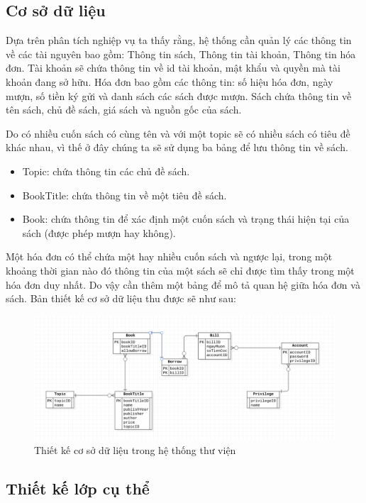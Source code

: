 \documentclass[../report.tex]{subfiles}
\begin{document}
\subsection{Cơ sở dữ liệu}
Dựa trên phân tích nghiệp vụ ta thấy rằng, hệ thống cần quản lý các thông 
tin về các tài nguyên bao gồm: Thông tin sách, Thông tin tài khoản, 
Thông tin hóa đơn.
Tài khoản sẽ chứa thông tin về id tài khoản, mật khẩu và quyền mà 
tài khoản đang sở hữu.
Hóa đơn bao gồm các thông tin: số hiệu hóa đơn, ngày mượn, 
số tiền ký gửi và danh sách các sách được mượn.
Sách chứa thông tin về tên sách, chủ đề sách, 
giá sách và nguồn gốc của sách. 

Do có nhiều cuốn sách có cùng tên và với một topic sẽ có nhiều sách có tiêu đề khác nhau,
vì thế ở đây chúng ta sẽ sử dụng ba bảng để lưu thông tin về sách. 
\begin{itemize}
      \item Topic: chứa thông tin các chủ đề sách.
\item BookTitle: chứa thông tin về một tiêu đề sách.
\item Book: chứa thông tin để xác định một cuốn sách và trạng thái 
hiện tại của sách (được phép mượn hay không).

\end{itemize}


Một hóa đơn có thể chứa một hay nhiều cuốn sách và ngược lại, trong một khoảng 
thời gian nào đó thông tin của một sách sẽ chỉ được tìm thấy trong một hóa đơn duy nhất. 
Do vậy cần thêm một bảng để mô tả quan hệ giữa hóa đơn và sách.
 Bản thiết kế cơ sở dữ liệu thu được sẽ như sau:
\begin{figure}[H]
\centering
\includegraphics[width=\textwidth]{figures/db.png}
\caption{Thiết kế cơ sở dữ liệu trong hệ thống thư viện}
\end{figure}

\subsection{Thiết kế lớp cụ thể}
\end{document}
